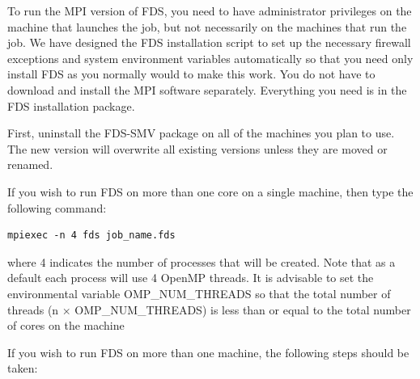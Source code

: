 \documentclass[11pt]{book}
\begin{document}
To run the MPI version of FDS, you need to have administrator privileges on the machine that launches the job, but not necessarily on the machines that run the job. We have designed the FDS installation script to set up the necessary firewall exceptions and system environment variables automatically so that you need only install FDS as you normally would to make this work. You do not have to download and install the MPI software separately. Everything you need is in the FDS installation package.

First, uninstall the FDS-SMV package on all of the machines you plan to use. The new version will overwrite all existing versions unless they are moved or renamed.

If you wish to run FDS on more than one core on a single machine, then type the following command:
\begin{lstlisting}
mpiexec -n 4 fds job_name.fds
\end{lstlisting}
where 4 indicates the number of processes that will be created.  Note that as a default each process will use 4 OpenMP threads. It is advisable to set the environmental variable {\ct OMP\_NUM\_THREADS} so that the total number of threads ({\ct n $\times$ OMP\_NUM\_THREADS}) is less than or equal to the total number of cores on the machine

If you wish to run FDS on more than one machine, the following steps should be taken:
\end{document}
